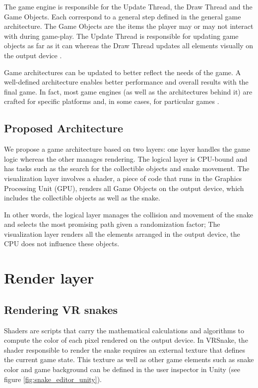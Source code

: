 \documentclass[runningheads]{llncs}
\begin{document}
The game engine is responsible for the Update Thread, the Draw Thread and the Game Objects. Each correspond to a general step defined in the general game architecture. The Game Objects are the items the player may or may not interact with during game-play. The Update Thread  is responsible for updating game objects as far as it can whereas the Draw Thread updates all elements visually on the output device \cite{portales}.

Game architectures can be updated to better reflect the needs of the game. A well-defined architecture enables better performance and overall results with the final game. In fact, most game engines (as well as the architectures behind it) are crafted for specific platforms and, in some cases, for particular games \cite{gregory_2019}. 


\subsection{Proposed Architecture} \label{sec:proposed-architecture}
We propose a game architecture based on two layers: 
one layer handles the game logic whereas the other manages rendering.  The logical layer is CPU-bound and has tasks such as the search for the collectible objects and snake movement. 
The visualization layer involves a shader, a piece of code that runs in the Graphics Processing Unit (GPU), renders all Game Objects on the output device, which includes the collectible objects as well as the snake.

In other words, the logical layer manages the collision and movement of the snake and selects the most promising path given a randomization factor; The visualization layer renders all the elements arranged in the output device, the CPU does not influence these objects.

\section{Render layer}

\subsection{Rendering VR snakes}
Shaders are scripts that carry the mathematical calculations and algorithms to compute the color of each pixel rendered on the output device. In VRSnake, the shader responsible to render the snake requires an external texture that defines the current game state. This texture as well as other game elements such as snake color and game background can be defined in the user inspector in Unity (see figure \ref{fig:snake_editor_unity}).
\end{document}
